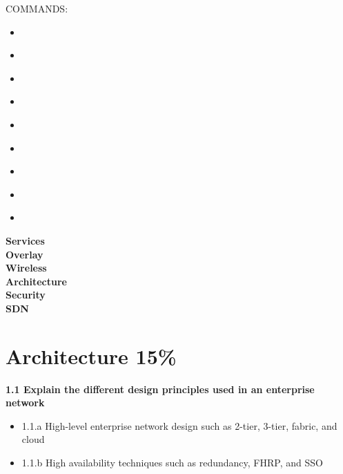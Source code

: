 \documentclass{article}
\begin{document}
COMMANDS:
	\begin{itemize}
	\item 
	\end{itemize}

	\begin{itemize}
	\item 
	\end{itemize}

	\begin{itemize}
	\item 
	\end{itemize}

	\begin{itemize}
	\item 
	\end{itemize}

	\begin{itemize}
	\item 
	\end{itemize}

	\begin{itemize}
	\item 
	\end{itemize}

	\begin{itemize}
	\item 
	\end{itemize}

	\begin{itemize}
	\item 
	\end{itemize}

	\begin{itemize}
	\item 
	\end{itemize}

\newpage
\noindent\textbf{Services}\\

\newpage
\noindent\textbf{Overlay}\\

\newpage
\noindent\textbf{Wireless}\\

\newpage
\noindent\textbf{Architecture}\\

\newpage
\noindent\textbf{Security}\\

\newpage
\noindent\textbf{SDN}\\

\newpage
\section{Architecture 15\%}
\textbf{1.1 Explain the different design principles used in an enterprise network}
\begin{itemize}
\item 1.1.a High-level enterprise network design such as 2-tier, 3-tier, fabric, and cloud
\item 1.1.b High availability techniques such as redundancy, FHRP, and SSO
\end{itemize}
\end{document}
